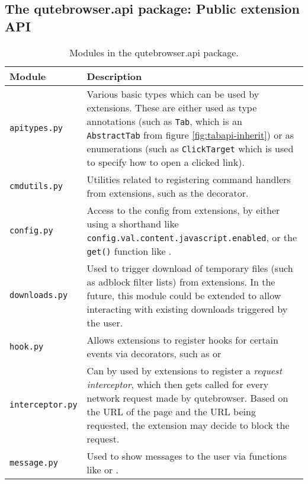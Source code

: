 \subsection[The qutebrowser.api package]{The qutebrowser.api package: Public extension API}

\begin{table}[H]
  \centering
  \begin{tabulary}{\linewidth}{lL}
    \toprule
    Module & Description \\
    \midrule
    \verb|apitypes.py| & Various basic types which can be used by extensions.
                         These are either used as type annotations (such as
                         \verb|Tab|, which is an \verb|AbstractTab| from figure
                         \ref{fig:tabapi-inherit}) or as enumerations (such as
                         \verb|ClickTarget| which is used to specify how to open
                         a clicked link). \\
    \verb|cmdutils.py| & Utilities related to registering command handlers from
                         extensions, such as the 
                         decorator. \\
    \verb|config.py| & Access to the config from extensions, by either using a
                       shorthand like
                       \verb|config.val.content.javascript.enabled|, or the
                       \verb|get()| function like
                       . \\
    \verb|downloads.py| & Used to trigger download of temporary files (such as
                          adblock filter lists) from extensions. In the future,
                          this module could be extended to allow interacting
                          with existing downloads triggered by the user. \\
    \verb|hook.py| & Allows extensions to register hooks for certain events via
                     decorators, such as  or
                      \\
    \verb|interceptor.py| & Can by used by extensions to register a
                            \emph{request interceptor}, which then gets called
                            for every network request made by qutebrowser. Based
                            on the URL of the page and the URL being requested,
                            the extension may decide to block the request. \\
    \verb|message.py| & Used to show messages to the user via functions like
                         or . \\
    \bottomrule
  \end{tabulary}
  \caption{Modules in the qutebrowser.api package.}
  \label{tab:apimodule}
\end{table}

